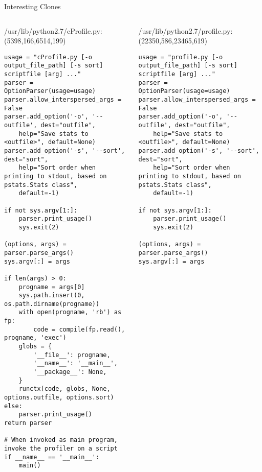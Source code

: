 \begin{frame}[shrink=35,fragile]{Interesting Clones}

\lstset{
    breaklines=true,
    language=Python
}

\begin{columns}
\begin{column}[t]{0.48\textwidth}
/usr/lib/python2.7/cProfile.py:(5398,166,6514,199)
\begin{lstlisting}
usage = "cProfile.py [-o output_file_path] [-s sort] scriptfile [arg] ..."
parser = OptionParser(usage=usage)
parser.allow_interspersed_args = False
parser.add_option('-o', '--outfile', dest="outfile",
    help="Save stats to <outfile>", default=None)
parser.add_option('-s', '--sort', dest="sort",
    help="Sort order when printing to stdout, based on pstats.Stats class",
    default=-1)

if not sys.argv[1:]:
    parser.print_usage()
    sys.exit(2)

(options, args) = parser.parse_args()
sys.argv[:] = args

if len(args) > 0:
    progname = args[0]
    sys.path.insert(0, os.path.dirname(progname))
    with open(progname, 'rb') as fp:
        code = compile(fp.read(), progname, 'exec')
    globs = {
        '__file__': progname,
        '__name__': '__main__',
        '__package__': None,
    }
    runctx(code, globs, None, options.outfile, options.sort)
else:
    parser.print_usage()
return parser

# When invoked as main program, invoke the profiler on a script
if __name__ == '__main__':
    main()
\end{lstlisting}
\end{column}

\begin{column}[t]{0.48\textwidth}
/usr/lib/python2.7/profile.py:(22350,586,23465,619)
\begin{lstlisting}
usage = "profile.py [-o output_file_path] [-s sort] scriptfile [arg] ..."
parser = OptionParser(usage=usage)
parser.allow_interspersed_args = False
parser.add_option('-o', '--outfile', dest="outfile",
    help="Save stats to <outfile>", default=None)
parser.add_option('-s', '--sort', dest="sort",
    help="Sort order when printing to stdout, based on pstats.Stats class",
    default=-1)

if not sys.argv[1:]:
    parser.print_usage()
    sys.exit(2)

(options, args) = parser.parse_args()
sys.argv[:] = args


\end{lstlisting}
\end{column}
\end{columns}
\end{frame}
